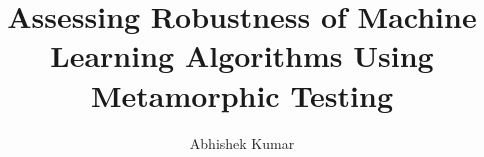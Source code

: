 \documentclass[print,ms]{unothesis}
\begin{document}
\title{Assessing Robustness of Machine Learning Algorithms Using Metamorphic Testing}
\author{Abhishek Kumar}
\memberc{\ } %

\maketitle

\begin{abstract}

\end{abstract}
\end{document}

